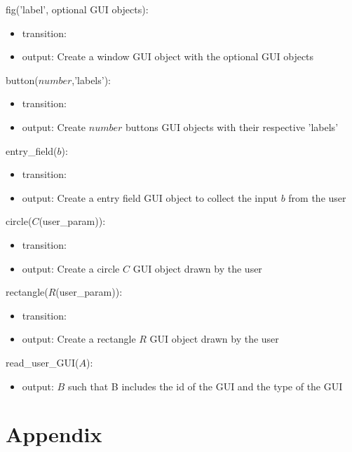\documentclass[12pt, titlepage]{article}
\begin{document}
\noindent fig('label', optional GUI objects):
\begin{itemize}
\item transition: 
\item output: Create a window GUI object with the optional GUI objects
\end{itemize}

\noindent button($number$,'labels'):
\begin{itemize}
\item transition:  
\item output: Create $number$ buttons GUI objects with their respective 'labels'
\end{itemize}

\noindent entry{\_}field($b$):
\begin{itemize}
\item transition:  
\item output: Create a entry field GUI object to collect the input $b$ from the user
\end{itemize}

\noindent circle($C$(user{\_}param)):
\begin{itemize}
\item transition:  
\item output: Create a circle $C$ GUI object drawn by the user 
\end{itemize}

\noindent rectangle($R$(user{\_}param)):
\begin{itemize}
\item transition:  
\item output: Create a rectangle $R$ GUI object drawn by the user 
\end{itemize}
\newpage

\noindent read{\_}user{\_}GUI($A$):
\begin{itemize}
\item output:  $B$ such that B includes the id of the GUI and the type of the GUI
\end{itemize}
\bigskip




\newpage

\section{Appendix} \label{Appendix}

\end{document}
